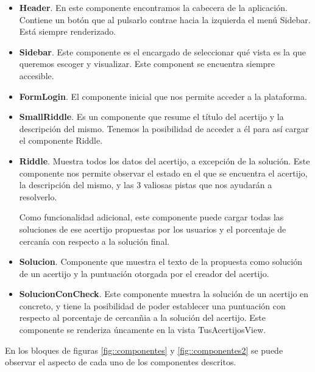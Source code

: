 \begin{itemize}
    \item \textbf{Header}. En este componente encontramos la cabecera de la aplicación. Contiene un botón que al pulsarlo contrae hacia la izquierda el menú Sidebar. Está siempre renderizado.
    \item \textbf{Sidebar}. Este componente es el encargado de seleccionar qué vista es la que queremos escoger y visualizar. Este component se encuentra siempre accesible.
    \item \textbf{FormLogin}. El componente inicial que nos permite acceder a la plataforma.
    \item \textbf{SmallRiddle}. Es un componente que resume el título del acertijo y la descripción del mismo. Tenemos la posibilidad de acceder a él para así cargar el componente Riddle.
    \item \textbf{Riddle}. Muestra todos los datos del acertijo, a excepción de la solución. Este componente nos permite observar el estado en el que se encuentra el acertijo, la descripción del mismo, y las 3 valiosas pistas que nos ayudarán a resolverlo.
    
    Como funcionalidad adicional, este componente puede cargar todas las soluciones de ese acertijo propuestas por los usuarios y el porcentaje de cercanía con respecto a la solución final.
    \item \textbf{Solucion}. Componente que muestra el texto de la propuesta como solución de un acertijo y la puntuación otorgada por el creador del acertijo.
    \item \textbf{SolucionConCheck}. Este componente muestra la solución de un acertijo en concreto, y tiene la posibilidad de poder establecer una puntuación con respecto al porcentaje de cercanñia a la solución del acertijo. Este componente se renderiza úncamente en la vista TusAcertijosView.
\end{itemize}

En los bloques de figuras \ref{fig::componentes} y \ref{fig::componentes2} se puede observar el aspecto de cada uno de los componentes descritos.

